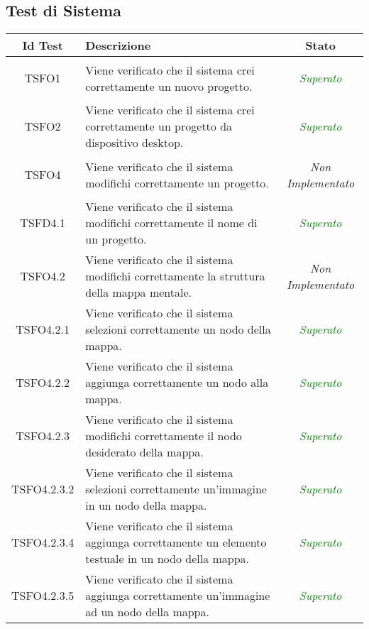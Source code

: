 \subsection{Test di Sistema}

\normalsize
\begin{longtable}{|c|>{}m{8cm}|c|}
\hline 
\textbf{Id Test} & \textbf{Descrizione} & \textbf{Stato}\\
\hline
\endhead
\hypertarget{TSFO1}{TSFO1} & Viene verificato che il sistema crei correttamente un nuovo progetto. & \textcolor{Green}{\textit{Superato}}\\ \hline
\hypertarget{TSFO2}{TSFO2} & Viene verificato che il sistema crei correttamente un progetto da dispositivo desktop. & \textcolor{Green}{\textit{Superato}}\\ \hline
\hypertarget{TSFO4}{TSFO4} & Viene verificato che il sistema modifichi correttamente un progetto. & \textit{Non Implementato}\\ \hline
\hypertarget{TSFD4.1}{TSFD4.1} & Viene verificato che il sistema modifichi correttamente il nome di un progetto. & \textcolor{Green}{\textit{Superato}}\\ \hline
\hypertarget{TSFO4.2}{TSFO4.2} & Viene verificato che il sistema modifichi correttamente la struttura della mappa mentale. & \textit{Non Implementato}\\ \hline
\hypertarget{TSFO4.2.1}{TSFO4.2.1} & Viene verificato che il sistema selezioni correttamente un nodo della mappa. & \textcolor{Green}{\textit{Superato}}\\ \hline
\hypertarget{TSFO4.2.2}{TSFO4.2.2} & Viene verificato che il sistema aggiunga correttamente un nodo alla mappa. & \textcolor{Green}{\textit{Superato}}\\ \hline
\hypertarget{TSFO4.2.3}{TSFO4.2.3} & Viene verificato che il sistema modifichi correttamente il nodo desiderato della mappa. & \textcolor{Green}{\textit{Superato}}\\ \hline
\hypertarget{TSFO4.2.3.2}{TSFO4.2.3.2} & Viene verificato che il sistema selezioni correttamente un'immagine in un nodo della mappa. & \textcolor{Green}{\textit{Superato}}\\ \hline
\hypertarget{TSFO4.2.3.4}{TSFO4.2.3.4} & Viene verificato che il sistema aggiunga correttamente un elemento testuale in un nodo della mappa. & \textcolor{Green}{\textit{Superato}}\\ \hline
\hypertarget{TSFO4.2.3.5}{TSFO4.2.3.5} & Viene verificato che il sistema aggiunga correttamente un’immagine ad un nodo della mappa. & \textcolor{Green}{\textit{Superato}}\\ \hline

\end{longtable}

